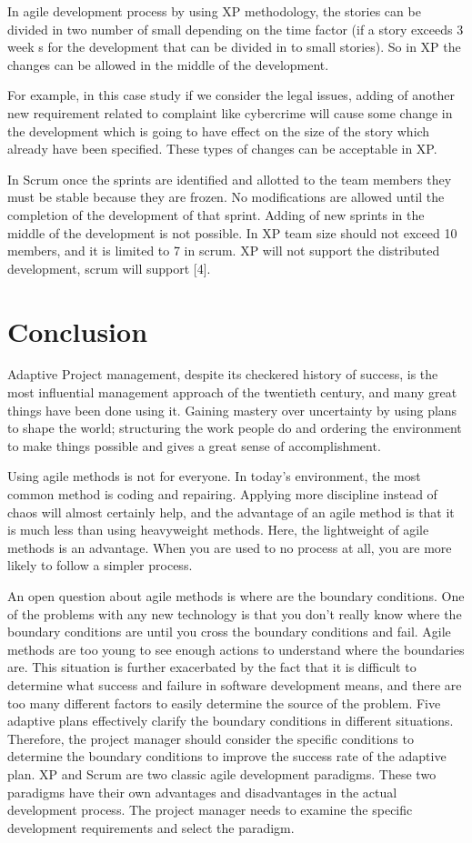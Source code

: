 \documentclass{sigchi}
\begin{document}
In agile development process by using XP methodology, the stories can be divided in two number of small depending on the time factor (if a story exceeds 3 week s for the development that can be divided in to small stories). So in XP the changes can be allowed in the middle of the development. 

For example, in this case study if we consider the legal issues, adding of another new requirement related to complaint like cybercrime will cause some change in the development which is going to have effect on the size of the story which already have been specified. These types of changes can be acceptable in XP. 

In Scrum once the sprints are identified and allotted to the team members they must be stable because they are frozen. No modifications are allowed until the completion of the development of that sprint. Adding of new sprints in the middle of the development is not possible. In XP team size should not exceed 10 members, and it is limited to 7 in scrum. XP will not support the distributed development, scrum will support [4].


\section{Conclusion}

Adaptive Project management, despite its checkered history of success, is the most inﬂuential management approach of the twentieth century, and many great things have been done using it. Gaining mastery over uncertainty by using plans to shape the world; structuring the work people do and ordering the environment to make things possible and gives a great sense of accomplishment.

Using agile methods is not for everyone. In today's environment, the most common method is coding and repairing. Applying more discipline instead of chaos will almost certainly help, and the advantage of an agile method is that it is much less than using heavyweight methods. Here, the lightweight of agile methods is an advantage. When you are used to no process at all, you are more likely to follow a simpler process.

An open question about agile methods is where are the boundary conditions. One of the problems with any new technology is that you don't really know where the boundary conditions are until you cross the boundary conditions and fail. Agile methods are too young to see enough actions to understand where the boundaries are. This situation is further exacerbated by the fact that it is difficult to determine what success and failure in software development means, and there are too many different factors to easily determine the source of the problem. Five adaptive plans effectively clarify the boundary conditions in different situations. Therefore, the project manager should consider the specific conditions to determine the boundary conditions to improve the success rate of the adaptive plan. XP and Scrum are two classic agile development paradigms. These two paradigms have their own advantages and disadvantages in the actual development process. The project manager needs to examine the specific development requirements and select the paradigm.



\end{document}
